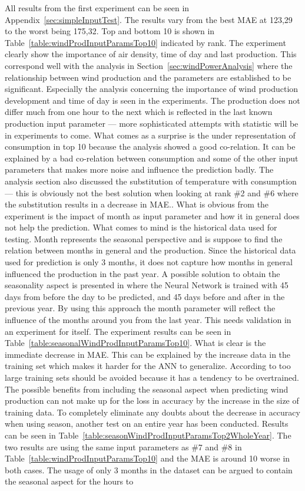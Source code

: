 \normalsize

All results from the first experiment can be seen in Appendix~\ref{sec:simpleInputTest}. The results vary from the best MAE at 123,29 to the worst being 175,32. Top and bottom 10 is shown in Table~\ref{table:windProdInputParamsTop10} indicated by rank. The experiment clearly show the importance of air density, time of day and last production. This correspond well with the analysis in Section~\ref{sec:windPowerAnalysis} where the relationship between wind production and the parameters are established to be significant. Especially the analysis concerning the importance of wind production development and time of day is  seen in the experiments. The production does not differ much from one hour to the next which is reflected in the last known production input parameter --- more sophisticated attempts with statistic will be in experiments to come. What comes as a surprise is the under representation of consumption in top 10 because the analysis showed a good co-relation. It can be explained by a bad co-relation between consumption and some of the other input parameters that makes more noise and influence the prediction badly. The analysis section also discussed the substitution of temperature with consumption --- this is obviously not the best solution when looking at rank \#2 and \#6 where the substitution results in a decrease in MAE.. What is obvious from the experiment is the impact of month as input parameter and how it in general does not help the prediction. What comes to mind is the historical data used for testing. Month represents the seasonal perspective and is suppose to find the relation between months in general and the production. Since the historical data used for prediction is only 3 months, it does not capture how months in general influenced the production in the past year. A possible solution to obtain the seasonality aspect is presented in\cite{pjmForecast} where the Neural Network is trained with 45 days from before the day to be predicted, and 45 days before and after in the previous year. By using this approach the month parameter will reflect the influence of the months around you from the last year. This needs validation in an experiment for itself. The experiment results can be seen in Table~\ref{table:seasonalWindProdInputParamsTop10}. What is clear is the immediate decrease in MAE. This can be explained by the increase data in the training set which makes it harder for the ANN to generalize. According to\cite{1} too large training sets should be avoided because it has a tendency to be overtrained. The possible benefits from including the seasonal aspect when predicting wind production can not make up for the loss in accuracy by the increase in the size of training data. To completely eliminate any doubts about the decrease in accuracy when using season, another test on an entire year has been conducted. Results can be seen in Table~\ref{table:seasonWindProdInputParamsTop2WholeYear}. The two results are using the same input parameters as \#7 and \#8 in Table~\ref{table:windProdInputParamsTop10} and the MAE is around 10 worse in both cases. The usage of only 3 months in the dataset can be argued to contain the seasonal aspect for the hours to 